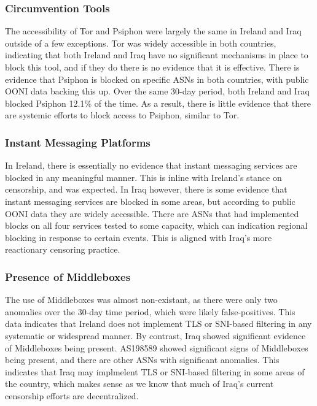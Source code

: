 \subsubsection{Circumvention Tools}

The accessibility of Tor and Psiphon were largely the same in Ireland and Iraq outside of a few exceptions. Tor was widely accessible in both countries, indicating that both Ireland and Iraq have no significant mechanisms in place to block this tool, and if they do there is no evidence that it is effective. There is evidence that Psiphon is blocked on specific ASNs in both countries, with public OONI data backing this up. Over the same 30-day period, both Ireland and Iraq blocked Psiphon 12.1\% of the time. As a result, there is little evidence that there are systemic efforts to block access to Psiphon, similar to Tor.

\subsubsection{Instant Messaging Platforms}

In Ireland, there is essentially no evidence that instant messaging services are blocked in any meaningful manner. This is inline with Ireland's stance on censorship, and was expected. In Iraq however, there is some evidence that instant messaging services are blocked in some areas, but according to public OONI data they are widely accessible. There are ASNs that had implemented blocks on all four services tested to some capacity, which can indication regional blocking in response to certain events. This is aligned with Iraq's more reactionary censoring practice.

\subsubsection{Presence of Middleboxes}

The use of Middleboxes was almost non-existant, as there were only two anomalies over the 30-day time period, which were likely false-positives. This data indicates that Ireland does not implement TLS or SNI-based filtering in any systematic or widespread manner. By contrast, Iraq showed significant evidence of Middleboxes being present. AS198589 showed significant signs of Middleboxes being present, and there are other ASNs with significant anomalies. This indicates that Iraq may implmelent TLS or SNI-based filtering in some areas of the country, which makes sense as we know that much of Iraq's current censorship efforts are decentralized. 

